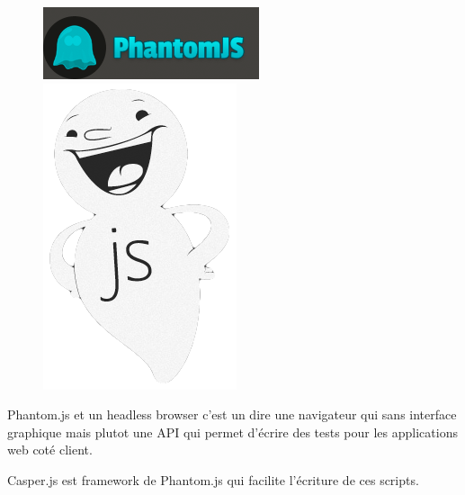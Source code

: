 \documentclass[a4paper]{article}
\begin{document}
\begin{figure}[H]
  \begin{center}
  \includegraphics[scale=0.5]{phantomjs.png}
  \includegraphics[scale=0.2]{casperjs.png}
  \end{center}
\end{figure}

Phantom.js et un headless browser c'est un dire une navigateur qui sans interface
graphique mais plutot une API qui permet d'écrire des tests pour les applications
web coté client.

Casper.js est framework de Phantom.js qui facilite l'écriture de ces scripts.
\end{document}
